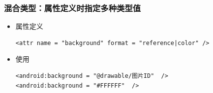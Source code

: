 \documentclass[9pt, b5paper]{article}
\begin{document}
\subsubsection{混合类型：属性定义时指定多种类型值}
\label{sec-1-5-7}
\begin{itemize}
\item 属性定义
\begin{verbatim}
<attr name = "background" format = "reference|color" />
\end{verbatim}
\item 使用
\begin{verbatim}
<android:background = "@drawable/图片ID"  />
<android:background = "#FFFFFF"  />
\end{verbatim}
\end{itemize}
\end{document}
